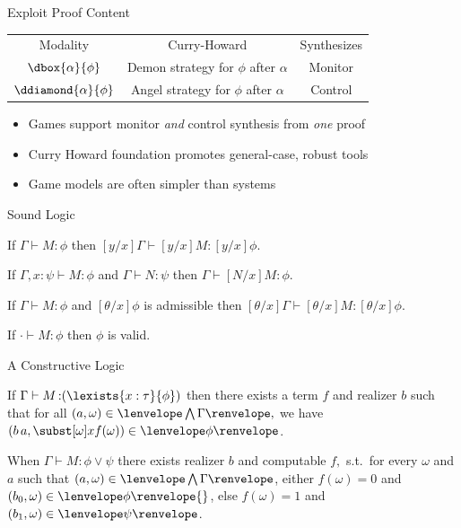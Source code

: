 \documentclass[slidestop,aspectratio=169]{beamer}
\newcommand{\fint}[2]{#2\lenvelope#1\renvelope}
\newcommand{\om}{\omega}
\newcommand{\ssub}[3]{\subst[{#1}]{#2}{#3}}
\newcommand{\rzFst}[1]{#1_0}
\newcommand{\rzSnd}[1]{#1_1}
\newcommand{\rzApp}[2]{#1\,#2}
\renewcommand{\aa}{a}
\newcommand{\ab}{b}
\newcommand{\esub}[3]{[{#3}/{#2}]{#1}}
\newcommand{\fintR}[1]{\fint{#1}{}} %
\newcommand{\cintR}[1]{\fintR{\bigwedge #1}}
\newcommand{\proves}[3]{#1\allowbreak\vdash #2 \allowbreak \mathop{:} #3}
\newcommand{\G}{\Gamma}
\theoremstyle{plain}
\theoremstyle{definition}
\theoremstyle{remark}
\begin{document}



\begin{frame}[t]{Exploit Proof Content}
 \begin{tabular}{ccc}
   Modality                  & Curry-Howard & Synthesizes \\
   $\dbox{\alpha}{\phi}$     & Demon strategy for $\phi$ after $\alpha$ & Monitor \\
   $\ddiamond{\alpha}{\phi}$ & Angel strategy for $\phi$ after $\alpha$ & Control
 \end{tabular}\pause
 \begin{itemize}
 \item Games support monitor \emph{and} control synthesis from \emph{one} proof
 \item Curry Howard foundation promotes general-case, robust tools
 \item Game models are often simpler than systems
 \end{itemize}
\end{frame}

\begin{frame}{Sound Logic}
\begin{lemma}[Renaming]
  If $\proves{\G}{M}{\phi}$ then $\proves{\esub{\G}{x}{y}}{\esub{M}{x}{y}}{\esub{\phi}{x}{y}}$.
\end{lemma}
\begin{lemma}
  If $\proves{\G,x:\psi}{M}{\phi}$ and $\proves{\G}{N}{\psi}$ then $\proves{\G}{\esub{M}{x}{N}}{\phi}$.
\end{lemma}
\begin{lemma}
  If $\proves{\G}{M}{\phi}$ and $\esub{\phi}{x}{\theta}$ is admissible then $\proves{\esub{\G}{x}{\theta}}{\esub{M}{x}{\theta}}{\esub{\phi}{x}{\theta}}$.
\end{lemma}
\begin{theorem}
  If $\proves{\cdot}{M}{\phi}$ then $\phi$ is valid.
\end{theorem}
\end{frame}

\begin{frame}[t]{A Constructive Logic}
\begin{lemma}
If $\proves{\Gamma}{M}{(\lexists{x:\tau}{\phi})}$ then there exists a term $f$ and realizer $\ab$ such that for all $(\aa,\om) \in \cintR{\G},$
we have $(\rzApp{\ab}{\aa},\ssub{\om}{x}{f(\om)}) \in \fintR{\phi}$.
\label{lem:term-ep}
\end{lemma}
\begin{lemma}
When $\proves{\Gamma}{M}{\phi \lor \psi}$ there exists realizer $\ab$ and computable $f,$ s.t.\ for every $\om$ and $\aa$ such that $(\aa,\omega) \in \cintR{\G}$, either $f(\omega)=0$ and $(\rzFst{\ab},\omega) \in \fintR{\phi}{}$, else $f(\omega)=1$ and $(\rzSnd{\ab},\omega) \in \fintR{\psi}$.
\end{lemma}
\end{frame}
\end{document}
